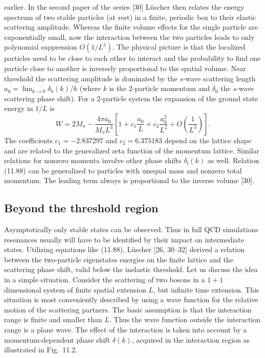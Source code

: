 earlier.
In the second paper of the series [30] L\"uscher then relates the energy
spectrum of two stable particles (at rest) in a finite, periodic box to their
elastic scattering amplitude. Whereas the finite volume effects for the single
particle are exponentially small, now the interaction between the two particles
leads to only polynomial suppression $O(1/L^3)$. The physical picture is that the
localized particles need to be close to each other to interact and the probability
to find one particle close to another is inversely proportional to the spatial
volume.
Near threshold the scattering amplitude is dominated by the $s$-wave scattering length $a_0 = \lim_{k\to 0} \delta_0(k)/k$ (where $k$ is the 2-particle momentum and
$\delta_0$ the $s$-wave scattering phase shift). For a 2-particle system the expansion of
the ground state energy in $1/L$ is
\begin{equation}
W = 2M_\pi - \frac{4\pi a_0}{M_\pi L^3}
\left[1 + c_1\frac{a_0}{L} + c_2\frac{a_0^2}{L^2} + O\left(\frac{1}{L^3}\right)\right] .
\end{equation}
The coefficients $c_1 = -2.837297$ and $c_2 = 6.375183$ depend on the lattice shape
and are related to the generalized zeta function of the momentum lattice.
Similar relations for nonzero momenta involve other phase shifts $\delta_l(k)$ as well.
Relation (11.88) can be generalized to particles with unequal mass and
nonzero total momentum. The leading term always is proportional to the
inverse volume [30].

\subsection{Beyond the threshold region}
Asymptotically only stable states can be observed. Thus in full QCD simulations resonances usually will have to be identified by their impact on intermediate states. Utilizing equations like (11.88), L\"uscher [26, 30--32] derived a
relation between the two-particle eigenstates energies on the finite lattice and
the scattering phase shift, valid below the inelastic threshold.
Let us discuss the idea in a simple situation. Consider the scattering of
two bosons in a $1{+}1$ dimensional system of finite spatial extension $L$, but
infinite time extension. This situation is most conveniently described by using
a wave function for the relative motion of the scattering partners. The basic
assumption is that the interaction range is finite and smaller than $L$. Thus
the wave function outside the interaction range is a plane wave. The effect of
the interaction is taken into account by a momentum-dependent phase shift
$\delta(k)$, acquired in the interaction region as illustrated in Fig.~11.2.

